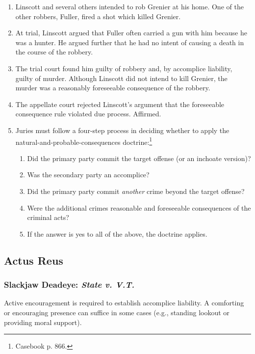\begin{enumerate}
    \item Linscott and several others intended to rob Grenier at his home. One 
    of the other robbers, Fuller, fired a shot which killed Grenier.
    \item At trial, Linscott argued that Fuller often carried a gun with him 
    because he was a hunter. He argued further that he had no intent of 
    causing a death in the course of the robbery.
    \item The trial court found him guilty of robbery and, by accomplice 
    liability, guilty of murder. Although Linscott did not intend to kill 
    Grenier, the murder was a reasonably foreseeable consequence of the 
    robbery.
    \item The appellate court rejected Linscott's argument that the 
    foreseeable consequence rule violated due process. Affirmed.
    \item Juries must follow a four-step process in deciding whether to apply 
    the natural-and-probable-consequences doctrine:\footnote{Casebook p. 866.}
    \begin{enumerate}
        \item Did the primary party commit the target offense (or an inchoate 
        version)?
        \item Was the secondary party an accomplice? 
        \item Did the primary party commit \emph{another} crime beyond the 
        target offense?
        \item Were the additional crimes reasonable and foreseeable 
        consequences of the criminal acts?
        \item If the answer is yes to all of the above, the doctrine applies.
    \end{enumerate}
\end{enumerate}

\subsection{Actus Reus}

\subsubsection{Slackjaw Deadeye: \emph{State v. V.T.}}

Active encouragement is required to establish accomplice liability. A 
comforting or encouraging presence can suffice in some cases (e.g., standing   
lookout or providing moral support).

